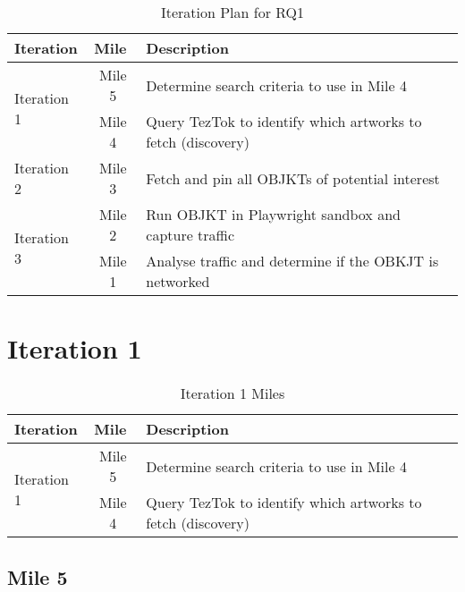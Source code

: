 \begin{table}[h]
\footnotesize
\centering
\begin{tabular}{|l|c|l|}
\hline
\textbf{Iteration}        & \multicolumn{1}{l|}{\textbf{Mile}} & \textbf{Description}                                         \\ \hline
\multirow{2}{*}{Iteration 1} & Mile 5                              & Determine search criteria to use in Mile 4                   \\ \cline{2-3} 
                             & Mile 4                              & Query TezTok to identify which artworks to fetch (discovery) \\ \hline
Iteration 2                  & Mile 3                              & Fetch and pin all OBJKTs of potential interest               \\ \hline
\multirow{2}{*}{Iteration 3} & Mile 2                              & Run OBJKT in Playwright sandbox and capture traffic          \\ \cline{2-3} 
                             & Mile 1                              & Analyse traffic and determine if the OBKJT is networked      \\ \hline
\end{tabular}
\caption{Iteration Plan for RQ1}
\end{table}



\section {Iteration 1}


\begin{table}[h]
\footnotesize
\centering
\begin{tabular}{|l|c|l|}
\hline
\textbf{Iteration}        & \multicolumn{1}{l|}{\textbf{Mile}} & \textbf{Description}                                         \\ \hline
\multirow{2}{*}{Iteration 1} & Mile 5                              & Determine search criteria to use in Mile 4                   \\ \cline{2-3} 
                             & Mile 4                              & Query TezTok to identify which artworks to fetch (discovery) \\ \hline
\end{tabular}
\caption{Iteration 1 Miles}
\end{table}


\subsection {Mile 5}

